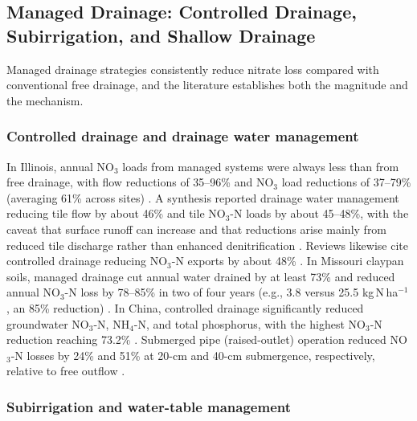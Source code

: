 \documentclass[11pt]{article}
\begin{document}
\subsection{Managed Drainage: Controlled Drainage, Subirrigation, and Shallow Drainage}

Managed drainage strategies consistently reduce nitrate loss compared with conventional free drainage, and the literature establishes both the magnitude and the mechanism.

\subsubsection{Controlled drainage and drainage water management}

In Illinois, annual NO$_3$ loads from managed systems were always less than from free drainage, with flow reductions of 35--96\% and NO$_3$ load reductions of 37--79\% (averaging 61\% across sites) \parencite{Cooke2012}. A synthesis reported drainage water management reducing tile flow by about 46\% and tile NO$_3$-N loads by about 45--48\%, with the caveat that surface runoff can increase and that reductions arise mainly from reduced tile discharge rather than enhanced denitrification \parencite{Ross2016}. Reviews likewise cite controlled drainage reducing NO$_3$-N exports by about 48\% \parencite{Ward2018}. In Missouri claypan soils, managed drainage cut annual water drained by at least 73\% and reduced annual NO$_3$-N loss by 78--85\% in two of four years (e.g., 3.8 versus 25.5 kg\,N\,ha$^{-1}$, an 85\% reduction) \parencite{Nash2015d}. In China, controlled drainage significantly reduced groundwater NO$_3$-N, NH$_4$-N, and total phosphorus, with the highest NO$_3$-N reduction reaching 73.2\% \parencite{Cui2016}. Submerged pipe (raised-outlet) operation reduced NO$_3$-N losses by 24\% and 51\% at 20-cm and 40-cm submergence, respectively, relative to free outflow \parencite{Tao2021}.

\subsubsection{Subirrigation and water-table management}
\end{document}
